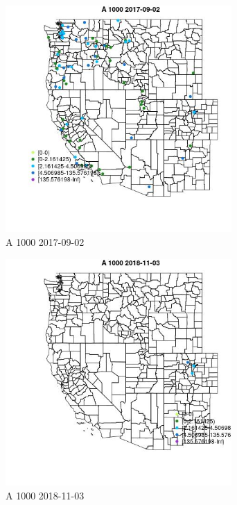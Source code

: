 \begin{figure} 
\centering  
\includegraphics[width=0.77\textwidth]{Code_Outputs/Report_ML_input_PM25_Step4_part_e_de_duplicated_aveswNAs_MapObsA_10002017-09-02.jpg} 
\caption{\label{fig:Report_ML_input_PM25_Step4_part_e_de_duplicated_aveswNAsMapObsA_10002017-09-02}A 1000 2017-09-02} 
\end{figure} 
 

\begin{figure} 
\centering  
\includegraphics[width=0.77\textwidth]{Code_Outputs/Report_ML_input_PM25_Step4_part_e_de_duplicated_aveswNAs_MapObsA_10002018-11-03.jpg} 
\caption{\label{fig:Report_ML_input_PM25_Step4_part_e_de_duplicated_aveswNAsMapObsA_10002018-11-03}A 1000 2018-11-03} 
\end{figure} 
 

